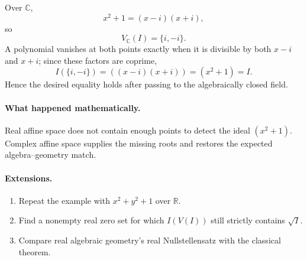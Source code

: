 Over \(\mathbb C\),
\[
x^2+1=(x-i)(x+i),
\]
so
\[
V_{\mathbb C}(I)=\{i,-i\}.
\]
A polynomial vanishes at both points exactly when it is divisible by both \(x-i\) and
\(x+i\); since these factors are coprime,
\[
I(\{i,-i\})=((x-i)(x+i))=(x^2+1)=I.
\]
Hence the desired equality holds after passing to the algebraically closed field.

\paragraph{What happened mathematically.}
Real affine space does not contain enough points to detect the ideal \((x^2+1)\).  Complex
affine space supplies the missing roots and restores the expected algebra--geometry match.

\paragraph{Extensions.}
\begin{enumerate}
\item Repeat the example with \(x^2+y^2+1\) over \(\mathbb R\).
\item Find a nonempty real zero set for which \(I(V(I))\) still strictly contains \(\sqrt I\).
\item Compare real algebraic geometry's real Nullstellensatz with the classical theorem.
\end{enumerate}
\fi
